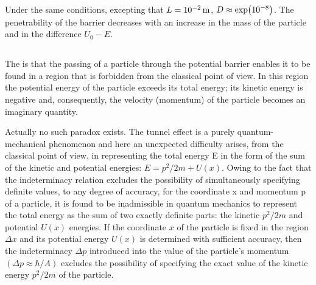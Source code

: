 Under the same conditions, excepting that $L = \SI{d-2}{\meter}$, $D \approx \exp (\num{d-8})$. The penetrability of the barrier decreases with an increase in the mass of the particle and in the difference $U_{0} - E$.

\subsection{}\label{38.7.4} The  is that the passing of a particle through the potential barrier enables it to be found in a region that is forbidden from the classical point of view. In this region the potential energy of the particle exceeds its total energy; its kinetic energy is negative and, consequently, the velocity (momentum) of the particle becomes an imaginary quantity.

Actually no such paradox exists. The tunnel effect is a purely
quantum-mechanical phenomenon and here an unexpected difficulty arises, from the classical point of view, in representing the total energy E in the form of the sum of the kinetic and potential energies: $E = p^{2}/2m + U (x)$. Owing to the fact
that the indeterminacy relation  excludes the possibility of simultaneously specifying definite values, to any degree of accuracy, for the coordinate x and momentum p of a particle, it is found to be inadmissible in quantum mechanics to represent the total energy as the sum of two exactly definite parts: the kinetic $p^{2}/2m$ and potential $U (x)$ energies. If the coordinate $x$ of the particle is fixed in the region $\Delta x$ and its potential energy $U (x)$ is determined with sufficient accuracy, then the indeterminacy $\Delta p$ introduced into the value of the particle's momentum $(\Delta p \approx \hbar/ A)$ excludes the possibility of specifying the exact value of the kinetic energy $p^{2}/2m$ of the particle.

